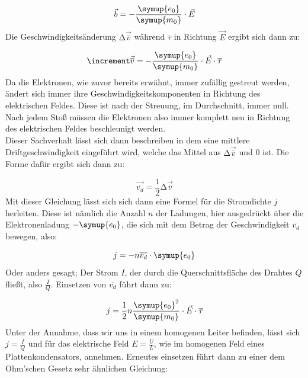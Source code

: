 \begin{equation}
  \vec{b} = -\frac{\symup{e_0}}{\symup{m_0}} \cdot \vec{E} \nonumber
\end{equation}
\noindent
Die Geschwindigkeitsänderung $\increment\vec{\overline{v}}$ während $\overline{\tau}$ in Richtung $\vec{E}$ ergibt sich dann zu:

\begin{equation}
  \increment\vec{\overline{v}}= -\frac{\symup{e_0}}{\symup{m_0}}\cdot \vec{E} \cdot \overline{\tau} \nonumber
\end{equation}
\noindent
Da die Elektronen, wie zuvor bereits erwähnt, immer zufällig gestreut werden, ändert sich immer ihre Geschwindigkeitskomponenten in Richtung
des elektrischen Feldes. Diese ist nach der Streuung, im Durchschnitt, immer null.
Nach jedem Stoß müssen die Elektronen also immer komplett neu in Richtung des elektrischen Feldes beschleunigt werden.\\
Dieser Sachverhalt lässt sich dann beschreiben in dem eine mittlere Driftgeschwindigkeit eingeführt wird, welche das Mittel aus $\increment\vec{\overline{v}}$ 
und 0 ist. Die Forme dafür ergibt sich dann zu:

\begin{equation}
  \vec{\overline{v_d}}=\frac{1}{2}\increment\vec{\overline{v}} \nonumber
\end{equation}
\noindent
Mit dieser Gleichung lässt sich sich dann eine Formel für die Stromdichte $j$ herleiten. Diese ist nämlich die Anzahl $n$ der Ladungen, hier ausgedrückt
über die Elektronenladung $-\symup{e_0}$, die sich mit dem Betrag der Geschwindigkeit $\overline{v_d}$ bewegen, also:

\begin{equation}
  j=-n\overline{v_d}\cdot \symup{e_0} 
  \label{eqn:j1}
\end{equation}
\noindent
Oder anders gesagt; Der Strom $I$, der durch die Querschnittsfläche des Drahtes $Q$ fließt, also $\frac{I}{Q}$.
Einsetzen von $\overline{v_d}$  führt dann zu:

\begin{equation}
  j=\frac{1}{2}n\frac{\symup{e_0}^2}{\symup{m_0}}\cdot \vec{E} \cdot \overline{\tau} \nonumber
\end{equation}
\noindent
Unter der Annahme, dass wir uns in einem homogenen Leiter befinden, lässt sich $j=\frac{I}{Q}$ und für das elektrische Feld $E=\frac{U}{L}$, wie im homogenen Feld eines Plattenkondensators, annehmen.
Erneutes einsetzen führt dann zu einer dem Ohm'schen Gesetz sehr ähnlichen Gleichung:

